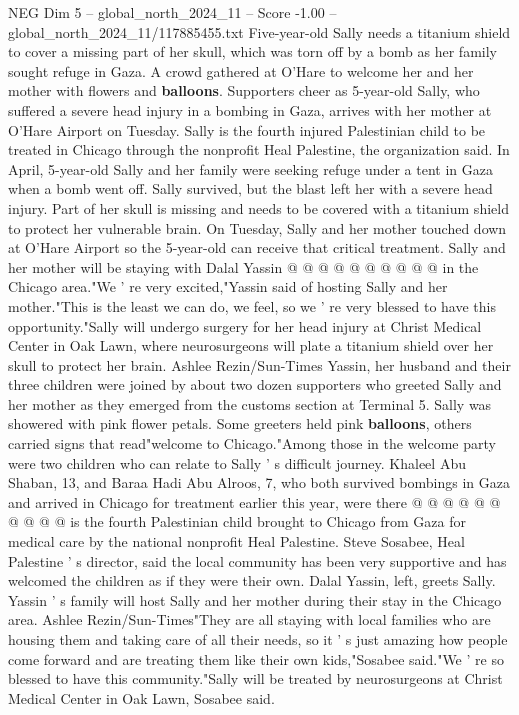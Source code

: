 \begin{textsample}{NEG Dim 5 – global\_north\_2024\_11 – Score -1.00 – global\_north\_2024\_11/117885455.txt}  \label{ex:f5_neg_427}
Five-year-old Sally needs a titanium shield to cover a missing part of her skull, which was torn off by a bomb as her family sought refuge in Gaza.
A crowd gathered at O'Hare to welcome her and her mother with flowers and \textbf{balloons}.
Supporters cheer as 5-year-old Sally, who suffered a severe head injury in a bombing in Gaza, arrives with her mother at O'Hare Airport on Tuesday.
Sally is the fourth injured Palestinian child to be treated in Chicago through the nonprofit Heal Palestine, the organization said.
In April, 5-year-old Sally and her family were seeking refuge under a tent in Gaza when a bomb went off.
Sally survived, but the blast left her with a severe head injury.
Part of her skull is missing and needs to be covered with a titanium shield to protect her vulnerable brain.
On Tuesday, Sally and her mother touched down at O'Hare Airport so the 5-year-old can receive that critical treatment.
Sally and her mother will be staying with Dalal Yassin @ @ @ @ @ @ @ @ @ @ in the Chicago area."We ' re very excited,"Yassin said of hosting Sally and her mother."This is the least we can do, we feel, so we ' re very blessed to have this opportunity."Sally will undergo surgery for her head injury at Christ Medical Center in Oak Lawn, where neurosurgeons will plate a titanium shield over her skull to protect her brain.
Ashlee Rezin/Sun-Times Yassin, her husband and their three children were joined by about two dozen supporters who greeted Sally and her mother as they emerged from the customs section at Terminal 5.
Sally was showered with pink flower petals.
Some greeters held pink \textbf{balloons}, others carried signs that read"welcome to Chicago."Among those in the welcome party were two children who can relate to Sally ' s difficult journey.
Khaleel Abu Shaban, 13, and Baraa Hadi Abu Alroos, 7, who both survived bombings in Gaza and arrived in Chicago for treatment earlier this year, were there @ @ @ @ @ @ @ @ @ @ is the fourth Palestinian child brought to Chicago from Gaza for medical care by the national nonprofit Heal Palestine.
Steve Sosabee, Heal Palestine ' s director, said the local community has been very supportive and has welcomed the children as if they were their own.
Dalal Yassin, left, greets Sally.
Yassin ' s family will host Sally and her mother during their stay in the Chicago area.
Ashlee Rezin/Sun-Times"They are all staying with local families who are housing them and taking care of all their needs, so it ' s just amazing how people come forward and are treating them like their own kids,"Sosabee said."We ' re so blessed to have this community."Sally will be treated by neurosurgeons at Christ Medical Center in Oak Lawn, Sosabee said.

\end{textsample}
